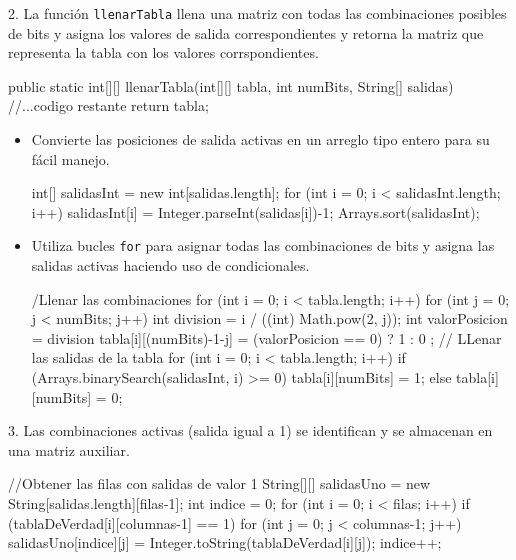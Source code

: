 2. La función \texttt{llenarTabla} llena una matriz con todas las combinaciones posibles de bits y asigna los valores de salida correspondientes y retorna la matriz que representa la tabla con los valores corrspondientes.
\begin{javaCode}
    public static int[][] llenarTabla(int[][] tabla, int numBits, String[] salidas) {
    //...codigo restante
    return tabla;
    }
\end{javaCode}
   \begin{itemize}
       \item Convierte las posiciones de salida activas en un arreglo tipo entero para su fácil manejo.
   \begin{javaCode}
    int[] salidasInt = new int[salidas.length];
    for (int i = 0; i < salidasInt.length; i++) {
        salidasInt[i] = Integer.parseInt(salidas[i])-1;
    }
    Arrays.sort(salidasInt);
   \end{javaCode}
       
       \item Utiliza bucles \texttt{for} para asignar todas las combinaciones de bits y asigna las salidas activas haciendo uso de condicionales.
    \begin{javaCode}
    /Llenar las combinaciones
    for (int i = 0; i < tabla.length; i++) {
        for (int j = 0; j < numBits; j++) {
            int division = i / ((int) Math.pow(2, j));
            int valorPosicion = division %
            tabla[i][(numBits)-1-j] = (valorPosicion == 0)   ?   1 : 0 ;
        }
    }
    // LLenar las salidas de la tabla
    for (int i = 0; i < tabla.length; i++) {
        if (Arrays.binarySearch(salidasInt, i) >= 0) {
            tabla[i][numBits] = 1;
        } else {
            tabla[i][numBits] = 0;
        }
    }
    \end{javaCode}

   \end{itemize}


3. Las combinaciones activas (salida igual a 1) se identifican y se almacenan en una matriz auxiliar.
\begin{javaCode}
//Obtener las filas con salidas de valor 1
String[][] salidasUno = new String[salidas.length][filas-1];
int indice = 0;
for (int i = 0; i < filas; i++) {
    if (tablaDeVerdad[i][columnas-1] == 1) {
        for (int j = 0; j < columnas-1; j++) {
            salidasUno[indice][j] = 
            Integer.toString(tablaDeVerdad[i][j]);
        }
        indice++;
    }
}
\end{javaCode}

